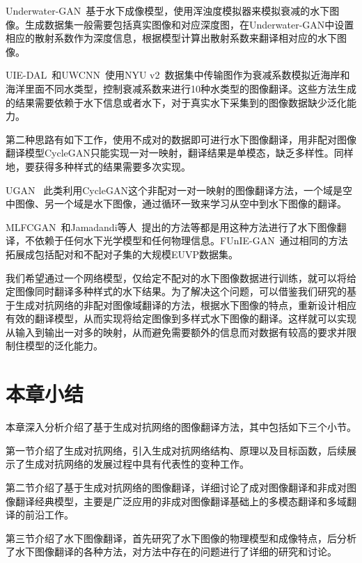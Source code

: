 Underwater-GAN~\cite{yu2018underwater}基于水下成像模型，使用浑浊度模拟器来模拟衰减的水下图像。生成数据集一般需要包括真实图像和对应深度图，在Underwater-GAN中设置相应的散射系数作为深度信息，根据模型计算出散射系数来翻译相对应的水下图像。

UIE-DAL~\cite{uplavikar2019all}和UWCNN~\cite{li2020underwater}使用NYU v2~\cite{silberman2012indoor}数据集中传输图作为衰减系数模拟近海岸和海洋里面不同水类型，控制衰减系数来进行10种水类型的图像翻译。这些方法生成的结果需要依赖于水下信息或者水下，对于真实水下采集到的图像数据缺少泛化能力。

第二种思路有如下工作，使用不成对的数据即可进行水下图像翻译，用非配对图像翻译模型CycleGAN只能实现一对一映射，翻译结果是单模态，缺乏多样性。同样地，要获得多种样式的结果需要多次实现。

UGAN~
\cite{fabbri2018enhancing}此类利用CycleGAN这个非配对一对一映射的图像翻译方法，一个域是空中图像、另一个域是水下图像，通过循环一致来学习从空中到水下图像的翻译。

MLFCGAN~\cite{liu2019mlfCGAN}和Jamadandi等人~\cite{jamadandi2019exemplar}提出的方法等都是用这种方法进行了水下图像翻译，不依赖于任何水下光学模型和任何物理信息。FUnIE-GAN~\cite{islam2020fast}通过相同的方法拓展成包括配对和不配对子集的大规模EUVP数据集。

我们希望通过一个网络模型，仅给定不配对的水下图像数据进行训练，就可以将给定图像同时翻译多种样式的水下结果。为了解决这个问题，可以借鉴我们研究的基于生成对抗网络的非配对图像域翻译的方法，根据水下图像的特点，重新设计相应有效的翻译模型，从而实现将给定图像到多样式水下图像的翻译。这样就可以实现从输入到输出一对多的映射，从而避免需要额外的信息而对数据有较高的要求并限制住模型的泛化能力。

\section{本章小结}
本章深入分析介绍了基于生成对抗网络的图像翻译方法，其中包括如下三个小节。

第一节介绍了生成对抗网络，引入生成对抗网络结构、原理以及目标函数，后续展示了生成对抗网络的发展过程中具有代表性的变种工作。

第二节介绍了基于生成对抗网络的图像翻译，详细讨论了成对图像翻译和非成对图像翻译经典模型，主要是广泛应用的非成对图像翻译基础上的多模态翻译和多域翻译的前沿工作。

第三节介绍了水下图像翻译，首先研究了水下图像的物理模型和成像特点，后分析了水下图像翻译的各种方法，对方法中存在的问题进行了详细的研究和讨论。